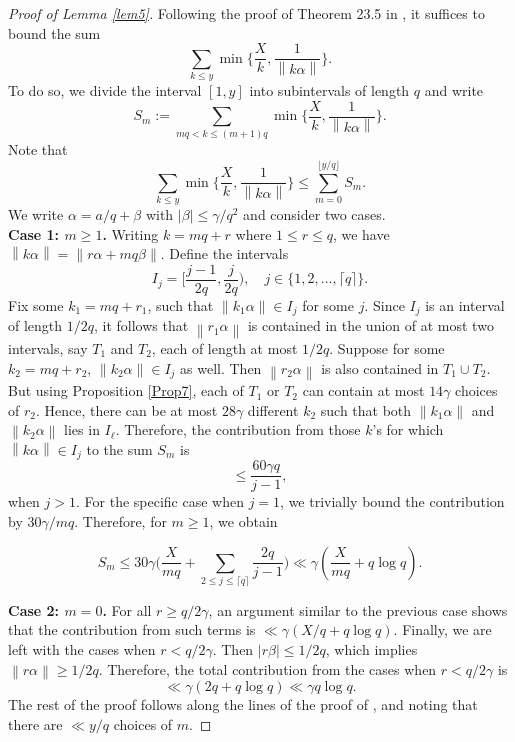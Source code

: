 \documentclass[11pt]{amsart}
\numberwithin{equation}{section}
\numberwithin{figure}{section}
\theoremstyle{definition}
\newcommand{\norm}[1]{\left\lVert#1\right\rVert}
\begin{document}
\begin{proof}[Proof of Lemma \textnormal{\ref{lem5}}]
Following the proof of Theorem 23.5 in \cite{K2019}, it suffices to bound the sum
\[\sum_{k \leqslant y} \min \bigg \{\frac{X}{k},\frac{1}{\norm{k\alpha}} \bigg \}.
\]
To do so, we divide the interval $[1,y]$ into subintervals of length $q$ and write
$$
S_m:=\sum_{m q<k \leqslant(m+1) q} \min \bigg \{\frac{X}{k},\frac{1}{\norm{k\alpha}} \bigg \}.
$$
Note that 
\[\sum_{k \leqslant y} \min \bigg \{\frac{X}{k},\frac{1}{\norm{k\alpha}} \bigg \} \leqslant\sum_{m=0}^{\lfloor y/q \rfloor} S_m.
\]
We write $\alpha=a/q+\beta$ with $\lvert \beta \rvert  \leqslant \gamma/q^2$ and consider two cases.\\

\noindent \textbf{Case 1: $m \geqslant 1$.} Writing $k=mq+r$ where $1 \leqslant r \leqslant q$, we have $
\norm{k\alpha} = \norm{r\alpha+mq\beta}$. Define the intervals 
\[I _j = \bigg [\frac{j-1}{2q}, \frac{j}{2q}\bigg ), \quad j \in \{1,2,\dots, \lceil q \rceil \}.
\]
Fix some $k_1=mq+r_1$, such that $ \norm{k_1\alpha} \in I _j$ for some $j$. Since $I _j$ is an interval of length $1/2q$, it follows that $\norm{r_1\alpha}$ is contained in the union of at most two intervals, say $T_1$ and $T_2$, each of length at most $1/2q$. Suppose for some  $k_2=mq+r_2$, $ \norm{k_2\alpha} \in I _j$ as well. Then $\norm{r_2\alpha}$ is also contained in $T_1 \cup T_2$. But using Proposition \ref{Prop7}, each of $T_1$ or $T_2$ can contain at most $14 \gamma$ choices of $r_2$. Hence, there can be at most $28 \gamma$ different $k_2$ such that both $\norm{k_1 \alpha}$ and $\norm{k_2 \alpha}$ lies in $I _\ell$. Therefore, the contribution from those $k$'s for which $\norm{k \alpha} \in I _j$ to the sum $S_m$ is
\[\leqslant\frac{60 \gamma q}{j-1},
\]
when $j >1$. For the specific case when $j=1$, we trivially bound the contribution by $30\gamma/mq$. Therefore, for $m \geqslant 1$, we obtain

$$
S_m \leqslant 30 \gamma \bigg (\frac{ X}{m q}+\sum_{2 \leqslant j \leqslant \lceil q \rceil } \frac{2 q}{j-1} \bigg) \ll \gamma \left (\frac{ X}{m q}+q \log q \right ) .
$$

\noindent \textbf{Case 2: $m=0$.} For all $r \geqslant q/2\gamma$, an argument similar to the previous case shows that the contribution from such terms is $\ll \gamma (X/q+q \log q)$. Finally, we are left with the cases when $r<q/2\gamma$. Then $\lvert r \beta \rvert \leqslant1/2q$, which implies $\norm{r \alpha} \geqslant 1/2q$. Therefore, the total contribution from the cases when $r < q/2\gamma$ is 
\[
\ll \gamma(2q+q \log q) \ll \gamma q \log q.
\]
The rest of the proof follows along the lines of the proof of \cite[Theorem 23.5]{K2019}, and noting that there are $\ll y/q$ choices of $m$.  
\end{proof}
\end{document}

